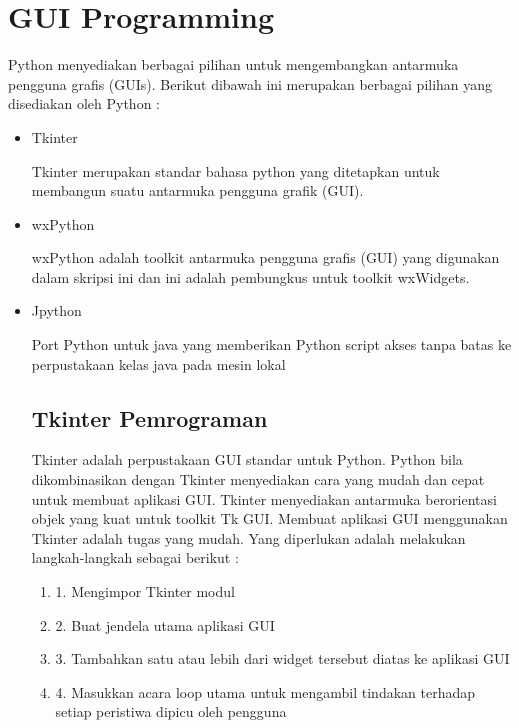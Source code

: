 \chapter{GUI Programming}
Python menyediakan berbagai pilihan untuk mengembangkan antarmuka pengguna grafis (GUIs). 
Berikut dibawah ini merupakan berbagai pilihan yang disediakan oleh Python :
\begin{itemize}
\item Tkinter \par
Tkinter merupakan standar bahasa python yang ditetapkan untuk membangun suatu antarmuka pengguna grafik (GUI). 
\item wxPython \par
wxPython adalah toolkit antarmuka pengguna grafis (GUI) yang digunakan dalam skripsi ini dan ini adalah pembungkus untuk toolkit wxWidgets.
\item Jpython \par
Port Python untuk java yang memberikan Python script akses tanpa batas ke perpustakaan kelas java pada mesin lokal \par
\vspace{12pt}
\noindent 
\section{Tkinter Pemrograman} \par
Tkinter adalah perpustakaan GUI standar untuk Python. Python bila dikombinasikan dengan Tkinter menyediakan cara yang mudah dan cepat untuk membuat aplikasi GUI. Tkinter menyediakan antarmuka berorientasi objek yang kuat untuk toolkit Tk GUI.
\noindent 
 \hspace*{0.5in} Membuat aplikasi GUI menggunakan Tkinter adalah tugas yang mudah. Yang diperlukan adalah melakukan langkah-langkah sebagai berikut : 
\begin{enumerate} 
\item 1. Mengimpor Tkinter modul 
\item 2. Buat jendela utama aplikasi GUI
\item 3. Tambahkan satu atau lebih dari widget tersebut diatas ke aplikasi GUI
\item 4. Masukkan acara loop utama untuk mengambil tindakan terhadap setiap peristiwa dipicu oleh pengguna
\end{enumerate}



\newpage


\end{itemize}

